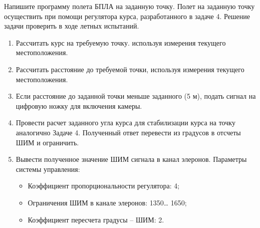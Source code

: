 
Напишите программу полета БПЛА на заданную точку. Полет на заданную точку осуществить при помощи регулятора курса, разработанного в задаче 4. Решение задачи проверить в ходе летных испытаний.

\solutionSection
\begin{enumerate}
    \item Рассчитать курс на требуемую точку. используя измерения текущего местоположения.     
    \item  Рассчитать расстояние до требуемой точки, используя измерения текущего местоположения.
    \item  Если расстояние до заданной точки меньше заданного (5 м), подать сигнал на цифровую ножку для включения камеры.
    \item  Провести расчет заданного угла курса для стабилизации курса на точку аналогично Задаче 4. Полученный ответ перевести из градусов в отсчеты ШИМ и ограничить.
    \item Вывести полученное значение ШИМ сигнала в канал элеронов. 
    Параметры системы управления:
    \begin{itemize}
        \item	Коэффициент пропорциональности регулятора: 4;
        \item	Ограничения ШИМ в канале элеронов: 1350… 1650;
        \item	Коэффициент пересчета градусы – ШИМ: 2.
    \end{itemize}
\end{enumerate}

